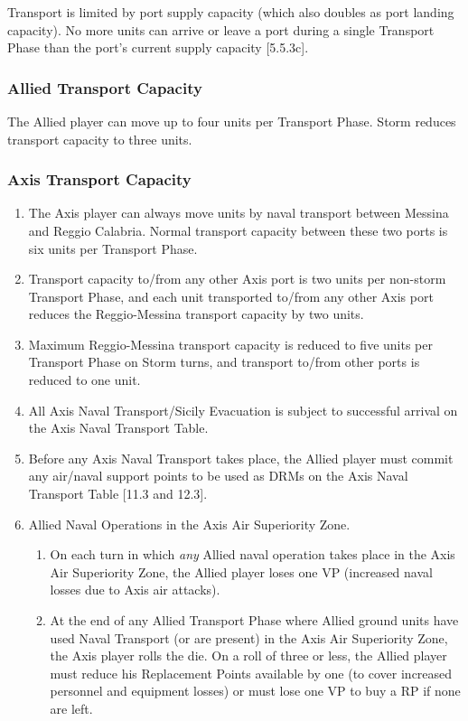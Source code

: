 \subsubsection{} Transport is limited by port supply capacity (which also doubles as port landing capacity). No more units can arrive or leave a port during a single Transport Phase than the port's current supply capacity [5.5.3c].

\subsubsection{\textbf{Allied Transport Capacity}}

The Allied player can move up to four units per Transport Phase. Storm reduces transport capacity to three units.

\subsubsection{\textbf{Axis Transport Capacity}}
\begin{enumerate}[label=\alph*.]
    \item The Axis player can always move units by naval transport between Messina and Reggio Calabria. Normal transport capacity between these two ports is six units per Transport Phase.
    \item Transport capacity to/from any other Axis port is two units per non-storm Transport Phase, and each unit transported to/from any other Axis port reduces the Reggio-Messina transport capacity by two units.
    \item Maximum Reggio-Messina transport capacity is reduced to five units per Transport Phase on Storm turns, and transport to/from other ports is reduced to one unit.
    \item All Axis Naval Transport/Sicily Evacuation is subject to successful arrival on the Axis Naval Transport Table.
    \item Before any Axis Naval Transport takes place, the Allied player must commit any air/naval support points to be used as DRMs on the Axis Naval Transport Table [11.3 and 12.3].
    \item Allied Naval Operations in the Axis Air Superiority Zone.
    \begin{enumerate}[label=\arabic*)]
        \item On each turn in which \textit{any} Allied naval operation takes place in the Axis Air Superiority Zone, the Allied player loses one VP (increased naval losses due to Axis air attacks).
        \item At the end of any Allied Transport Phase where Allied ground units have used Naval Transport (or are present) in the Axis Air Superiority Zone, the Axis player rolls the die. On a roll of three or less, the Allied player must reduce his Replacement Points available by one (to cover increased personnel and equipment losses) or must lose one VP to buy a RP if none are left.
    \end{enumerate}
\end{enumerate}
